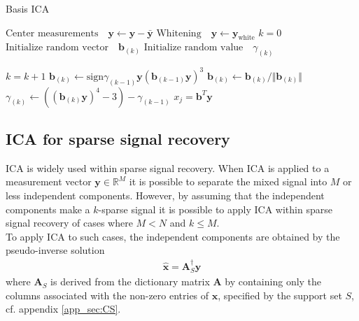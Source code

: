 \begin{algorithm}[H]
\caption{Basis ICA}
\begin{algorithmic}[1]
			\State $\text{Center measurements} \quad \textbf{y} \gets \textbf{y} - \bar{\textbf{y}}$
			\State $\text{Whitening} \quad \textbf{y}\gets \textbf{y}_{\text{white}}$ 
			\EndProcedure  
			\State
			\State$k=0$            
            \State$\text{Initialize random vector} \quad \textbf{b}_{(k)}$ 
            \State$\text{Initialize random value} \quad \gamma_{(k)}$
            
               		\State $k = k+1$
                	\State $\textbf{b}_{(k)} \gets \text{sign}\gamma_{(k-1)} \textbf{y}(\textbf{b}_{(k-1)} \textbf{y})^3$
                	\State $\textbf{b}_{(k)} \gets \textbf{b}_{(k)}/\Vert \textbf{b}_{(k)} \Vert $ 
                	\State $\gamma_{(k)} \gets ((\textbf{b}_{(k)} \textbf{y})^4 - 3) - \gamma_{(k-1)} $
          		\EndWhile
          		\State $x_{j} = \textbf{b}^T\textbf{y}$
          	\EndFor
          	
            \EndProcedure
        \end{algorithmic} 
        \label{alg:basicICA}
\end{algorithm}

\subsection{ICA for sparse signal recovery}
ICA is widely used within sparse signal recovery.   
When ICA is applied to a measurement vector $\mathbf{y} \in \mathbb{R}^{M}$ it is possible to separate the mixed signal into $M$ or less independent components. 
However, by assuming that the  independent components make a $k$-sparse signal it is possible to apply ICA within sparse signal recovery of cases where $M < N$ and $k \leq M$. 
\\
To apply ICA to such cases, the independent components are obtained by the pseudo-inverse solution 
\begin{align*}
\hat{\mathbf{x}} = \mathbf{A}_S^{\dagger} \mathbf{y}
\end{align*}
where $\mathbf{A}_S$ is derived from the dictionary matrix $\mathbf{A}$ by containing only the columns associated with the non-zero entries of $\textbf{x}$, specified by the support set $S$, cf. appendix \ref{app_sec:CS}. 
